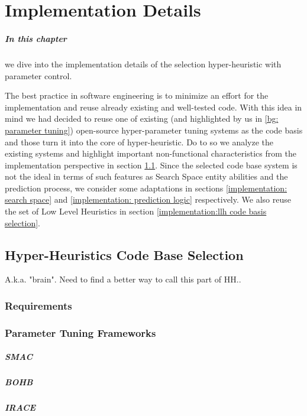 \chapter{Implementation Details}
\paragraph{In this chapter} we dive into the implementation details of the selection hyper-heuristic with parameter control.
 
The best practice in software engineering is to minimize an effort for the implementation and reuse already existing and well-tested code.
With this idea in mind we had decided to reuse one of existing (and highlighted by us in \ref{bg: parameter tuning}) open-source hyper-parameter tuning systems as the code basis and those turn it into the core of hyper-heuristic. 
Do to so we analyze the existing systems and highlight important non-functional characteristics from the implementation perspective in section \ref{implementation:hh code basis section}. Since the selected code base system is not the ideal in terms of such features as Search Space entity abilities and the prediction process, we consider some adaptations in sections \ref{implementation: search space} and \ref{implementation: prediction logic} respectively.
We also reuse the set of Low Level Heuristics in section \ref{implementation:llh code basis selection}.


\section{Hyper-Heuristics Code Base Selection}\label{implementation:hh code basis section}
A.k.a. "brain". Need to find a better way to call this part of HH..
\subsection{Requirements}
\subsection{Parameter Tuning Frameworks}
\paragraph{SMAC}
\paragraph{BOHB}
\paragraph{IRACE}
